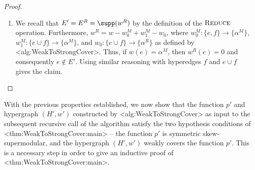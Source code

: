 \documentclass{article}
\def\Cref#1{<#1>}%
\newcommand{\reduce}{\ensuremath{\textsc{Reduce}}\xspace}
\begin{document}
\begin{proof}
\begin{enumerate}
     Then, we have the following: $$p(X) = b_{(H^M, w^M)}(X) = b_{(H,w)}(X) - \alpha^M \geq b_{(H,w)}(X) - \beta^M \geq b_{(H,w)}(X) - (b_{(H,w)}(X) - p(X)) = p(X).$$
    Thus, all inequalities are equations, and we have that $\alpha^M = \beta^M$.

    \item 
    We recall that $E' = E^R = \supp({w^R})$ by the definition of the \reduce operation. Furthermore, $w^R = w - w_0^M + w_1^M - w_0$, where $w_0^M:\{e, f\}\rightarrow\{\alpha^M\}$, $w_1^M:\{e\cup f\} \rightarrow\{\alpha^M\}$, and $w_0:\{e\cup f\}\rightarrow\{\alpha^R\}$ as defined by \Cref{alg:WeakToStrongCover}. Thus, if $w(e) = \alpha^M$, then $w^R(e) = 0$ and consequently $e \not \in E'$. Using similar reasoning with hyperedges $f$ and $e\cup f$ gives the claim.
    \fi
\end{enumerate}
\end{proof}

With the previous properties established, we now show that the function $p'$ and hypergraph $(H', w')$ constructed by \Cref{alg:WeakToStrongCover}  as input to the subsequent recursive call of the algorithm satisfy the two hypothesis conditions of \Cref{thm:WeakToStrongCover:main}  --  the function $p'$ is symmetric skew-supermodular, and the hypergraph $(H', w')$ weakly covers the function $p'$. This is a necessary step in order to give an inductive proof of \Cref{thm:WeakToStrongCover:main}. 
\end{document}
